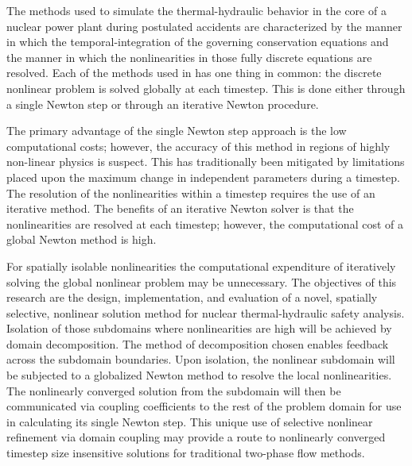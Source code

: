 The methods used to simulate the thermal-hydraulic behavior in the core of a nuclear power plant during postulated accidents are characterized by the manner in which the temporal-integration of the governing conservation equations and the manner in which the nonlinearities in those fully discrete equations are resolved.
Each of the methods used in has one thing in common: the discrete nonlinear problem is solved globally at each timestep.
This is done either through a single Newton step or through an iterative Newton procedure.

The primary advantage of the single Newton step approach is the low computational costs; however, the accuracy of this method in regions of highly non-linear physics is suspect.
This has traditionally been mitigated by limitations placed upon the maximum change in independent parameters during a timestep.
The resolution of the nonlinearities within a timestep requires the use of an iterative method.
The benefits of an iterative Newton solver is that the nonlinearities are resolved at each timestep; however, the computational cost of a global Newton method is high.

For spatially isolable nonlinearities the computational expenditure of iteratively solving the global nonlinear problem may be unnecessary.
The objectives of this research are the design, implementation, and evaluation of a novel, spatially selective, nonlinear solution method for nuclear thermal-hydraulic safety analysis.
Isolation of those subdomains where nonlinearities are high will be achieved by domain decomposition.
The method of decomposition chosen enables feedback across the subdomain boundaries. 
Upon isolation, the nonlinear subdomain will be subjected to a globalized Newton method to resolve the local nonlinearities.
The nonlinearly converged solution from the subdomain will then be communicated via coupling coefficients to the rest of the problem domain for use in calculating its single Newton step.
This unique use of selective nonlinear refinement via domain coupling may provide a route to nonlinearly converged timestep size insensitive solutions for traditional two-phase flow methods.